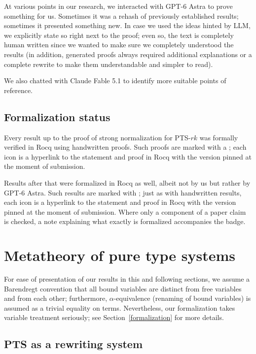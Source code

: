 \documentclass{article}
\theoremstyle{definition}
\theoremstyle{remark}
\begin{document}
At various points in our research, we interacted with
GPT-6 Astra \cite{gpt6astra2026} to prove something for
us. Sometimes it was a rehash of previously established
results; sometimes it presented something new. In case
we used the ideas hinted by LLM, we explicitly state so
right next to the proof; even so, the text is
completely human written since we wanted to make sure
we completely understood the results (in addition,
generated proofs always required additional
explanations or a complete rewrite to make them
understandable and simpler to read).

We also chatted with Claude Fable 5.1
\cite{claude_fable} to identify more suitable points of
reference.

\subsection{Formalization status}

Every result up to the proof of strong normalization
for PTS-$rk$ was formally verified in Rocq using
handwritten proofs. Such proofs are marked with a
; each
icon is a hyperlink to the statement and proof in Rocq
with the version pinned at the moment of submission.

Results after that were formalized in Rocq as well,
albeit not by us but rather by GPT-6 Astra. Such
results are marked with
;
just as with handwritten results, each icon is a
hyperlink to the statement and proof in Rocq with the
version pinned at the moment of submission. Where only
a component of a paper claim is checked, a note
explaining what exactly is formalized accompanies the
badge.

\section{Metatheory of pure type systems}
\label{pts-metatheory}

For ease of presentation of our results in this and
following sections, we assume a Barendregt convention
\cite{barendregt1984lambda} that all bound variables
are distinct from free variables and from each other;
furthermore, $\alpha$-equivalence (renaming of bound
variables) is assumed as a trivial equality on terms.
Nevertheless, our formalization takes variable
treatment seriously; see Section~\ref{formalization}
for more details.

\subsection{PTS as a rewriting system}
\end{document}
